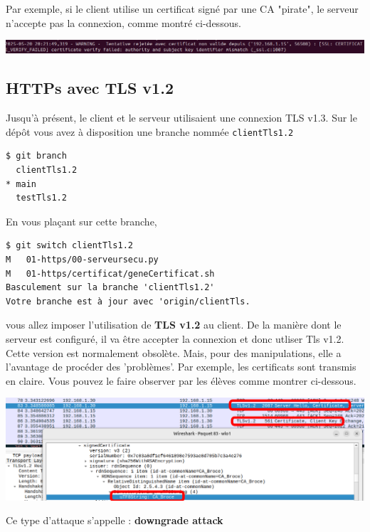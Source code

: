\documentclass[french, 12pt]{article}%
\begin{document}
Par exemple, si le client utilise un certificat signé par une CA "pirate", le serveur n'accepte pas la connexion, comme montré ci-dessous.

\begin{center}
\includegraphics[scale=0.5]{./ressource/certPirate}
\end{center}

\subsection{HTTPs avec TLS v1.2}

Jusqu'à présent, le client et le serveur utilisaient une connexion TLS v1.3. Sur le dépôt vous avez à disposition une branche nommée \verb?clientTls1.2?

\begin{lstlisting}[style=commande]
$ git branch 
  clientTls1.2
* main
  testTls1.2
\end{lstlisting}

En vous plaçant sur cette branche,
\begin{lstlisting}[style=commande]
$ git switch clientTls1.2 
M	01-https/00-serveursecu.py
M	01-https/certificat/geneCertificat.sh
Basculement sur la branche 'clientTls1.2'
Votre branche est à jour avec 'origin/clientTls.
\end{lstlisting}
vous allez imposer l'utilisation de \textbf{TLS v1.2} au client. De la manière dont le serveur est configuré, il va être accepter la connexion et donc utliser Tls v1.2. Cette version est normalement obsolète. Mais, pour des manipulations, elle a l'avantage de procéder des 'problèmes'. Par exemple, les certificats sont transmis en claire. 
Vous pouvez le faire observer par les élèves comme montrer ci-dessous.

\begin{center}
\includegraphics[scale=0.6	]{./ressource/tls1-2_Cert}
\end{center}

Ce type d'attaque s'appelle : \textbf{downgrade attack}
\end{document}
